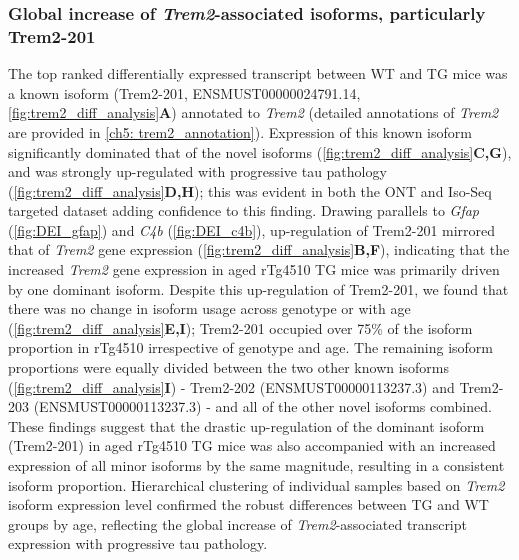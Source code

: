 \clearpage
\subsubsection{Global increase of \textit{Trem2}-associated isoforms, particularly Trem2-201}
\label{trem2_diff}
The top ranked differentially expressed transcript between WT and TG mice was a known isoform (Trem2-201, ENSMUST00000024791.14, \cref{fig:trem2_diff_analysis}\textbf{A}) annotated to \textit{Trem2} (detailed annotations of \textit{Trem2} are provided in \cref{ch5: trem2_annotation}). Expression of this known isoform significantly dominated that of the novel isoforms (\cref{fig:trem2_diff_analysis}\textbf{C,G}), and was strongly up-regulated with progressive tau pathology (\cref{fig:trem2_diff_analysis}\textbf{D,H}); this was evident in both the ONT and Iso-Seq targeted dataset adding confidence to this finding. Drawing parallels to \textit{Gfap} (\cref{fig:DEI_gfap}) and \textit{C4b} (\cref{fig:DEI_c4b}), up-regulation of Trem2-201 mirrored that of \textit{Trem2} gene expression (\cref{fig:trem2_diff_analysis}\textbf{B,F}), indicating that the increased \textit{Trem2} gene expression in aged rTg4510 TG mice was primarily driven by one dominant isoform. Despite this up-regulation of Trem2-201, we found that there was no change in isoform usage across genotype or with age (\cref{fig:trem2_diff_analysis}\textbf{E,I}); Trem2-201 occupied over 75\% of the isoform proportion in rTg4510 irrespective of genotype and age. The remaining isoform proportions were equally divided between the two other known isoforms (\cref{fig:trem2_diff_analysis}\textbf{I}) - Trem2-202 (ENSMUST00000113237.3) and Trem2-203 (ENSMUST00000113237.3) - and all of the other novel isoforms combined. These findings suggest that the drastic up-regulation of the dominant isoform (Trem2-201) in aged rTg4510 TG mice was also accompanied with an increased expression of all minor isoforms by the same magnitude, resulting in a consistent isoform proportion. Hierarchical clustering of individual samples based on \textit{Trem2} isoform expression level confirmed the robust differences between TG and WT groups by age, reflecting the global increase of \textit{Trem2}-associated transcript expression with progressive tau pathology.  


